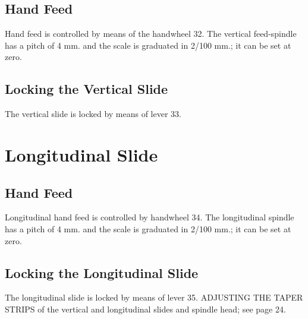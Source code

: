 \subsection*{Hand Feed}
Hand feed is controlled by means of the handwheel 32.
The vertical feed-spindle has a pitch of 4 mm. and the scale
is graduated in 2/100 mm.; it can be set at zero.

\subsection*{Locking the Vertical Slide}

The vertical slide is locked by means of lever 33.

\section*{Longitudinal Slide}
\subsection*{Hand Feed}

Longitudinal hand feed is controlled by handwheel 34.
The longitudinal spindle has a pitch of 4 mm. and the scale is
graduated in 2/100 mm.; it can be set at zero.

\subsection*{Locking the Longitudinal Slide}

The longitudinal slide is locked by means of lever 35.
ADJUSTING THE TAPER STRIPS of the vertical and longitudinal
slides and spindle head; see page 24.
